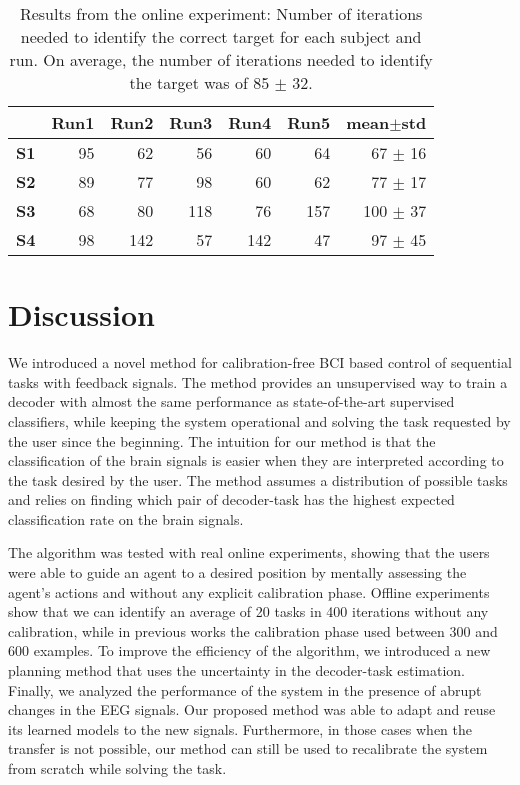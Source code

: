 \begin{table}[!ht]
\centering
\begin{footnotesize}
\begin{tabular}{r|rrrrr|r}
    & \textbf{Run1} & \textbf{Run2} & \textbf{Run3} & \textbf{Run4} & \textbf{Run5} & \textbf{mean$\pm$std} \\\hline
    \textbf{S1} & 95 & 62 & 56 & 60 & 64 & 67 $\pm$ 16 \\
    \textbf{S2} & 89 & 77 & 98 & 60 & 62  & 77 $\pm$ 17 \\
    \textbf{S3} & 68 & 80 & 118 & 76 & 157 & 100 $\pm$ 37 \\
    \textbf{S4} & 98 & 142 & 57 & 142 & 47 & 97 $\pm$ 45 \\
\end{tabular}
\end{footnotesize}
  \caption{Results from the online experiment: Number of iterations needed to identify the correct target for each subject and run. On average, the number of iterations needed to identify the target was of 85 $\pm$ 32.}
  \label{ch6tab:steps}
\end{table}

\section{Discussion}

We introduced a novel method for calibration-free BCI based control of sequential tasks with feedback signals. The method provides an unsupervised way to train a decoder with almost the same performance as state-of-the-art supervised classifiers, while keeping the system operational and solving the task requested by the user since the beginning. 
%
The intuition for our method is that the classification of the brain signals is easier when they are interpreted according to the task desired by the user. The method assumes a distribution of possible tasks and relies on finding which pair of decoder-task has the highest expected classification rate on the brain signals. 


The algorithm was tested with real online experiments, showing that the users were able to guide an agent to a desired position by mentally assessing the agent's actions and without any explicit calibration phase. Offline experiments show that we can identify an average of 20 tasks in 400 iterations without any calibration, while in previous works the calibration phase used between 300 and 600 examples. To improve the efficiency of the algorithm, we introduced a new planning method that uses the uncertainty in the decoder-task estimation. Finally, we analyzed the performance of the system in the presence of abrupt changes in the EEG signals. Our proposed method was able to adapt and reuse its learned models to the new signals. Furthermore, in those cases when the transfer is not possible, our method can still be used to recalibrate the system from scratch while solving the task.

